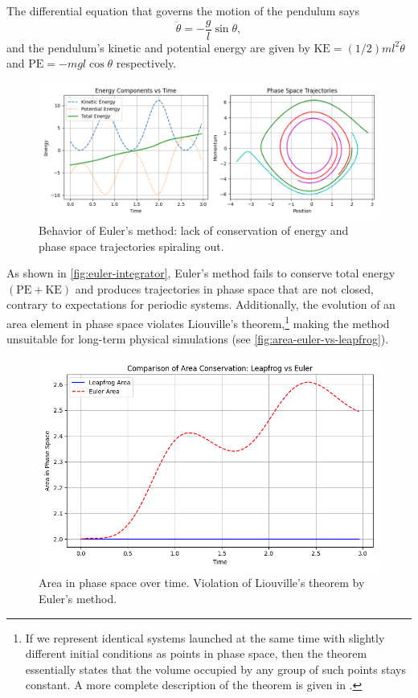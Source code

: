 The differential equation that governs the motion of the pendulum says
\begin{equation*}
    \ddot{\theta} = -\frac{g}{l}\sin\theta,
\end{equation*}
and the pendulum's kinetic and potential energy are given by $\textrm{KE} = (1/2)ml^2\dot{\theta}$ and $\textrm{PE} = -mgl\cos\theta$ respectively.
\begin{figure}[htp]
    \centering
    \includegraphics[scale=0.6]{chapters/time-integration/img/euler-pendulum.png}
    \caption{Behavior of Euler's method: lack of conservation of energy and phase space trajectories spiraling out.}
    \label{fig:euler-integrator}
\end{figure}
As shown in \autoref{fig:euler-integrator}, Euler's method fails to conserve total energy $(\textrm{PE} + \textrm{KE})$ and produces trajectories in phase space that are not closed, contrary to expectations for periodic systems.
Additionally, the evolution of an area element in phase space violates Liouville's theorem,\footnote{If we represent identical systems launched at the same time with slightly different initial conditions as points in phase space, then the theorem essentially states that the volume occupied by any group of such points stays constant.
    A more complete description of the theorem is given in \cite{taylor2005classical}.
}
making the method unsuitable for long-term physical simulations (see \autoref{fig:area-euler-vs-leapfrog}).
\begin{figure}[htp]
    \centering
    \includegraphics[scale=0.4]{chapters/time-integration/img/area-leap-vs-euler.png}
    \caption{Area in phase space over time. Violation of Liouville's theorem by Euler's method.}
    \label{fig:area-euler-vs-leapfrog}
\end{figure}